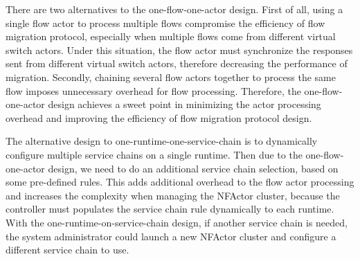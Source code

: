 There are two alternatives to the one-flow-one-actor design. First of all, using a single flow actor to process multiple flows compromise the efficiency of flow migration protocol, especially when multiple flows come from different virtual switch actors. Under this situation, the flow actor must synchronize the responses sent from different virtual switch actors, therefore decreasing the performance of migration. Secondly, chaining several flow actors together to process the same flow imposes unnecessary overhead for flow processing. Therefore, the one-flow-one-actor design achieves a sweet point in minimizing the actor processing overhead and improving the efficiency of flow migration protocol design.

The alternative design to one-runtime-one-service-chain is to dynamically configure multiple service chains on a single runtime. Then due to the one-flow-one-actor design, we need to do an additional service chain selection, based on some pre-defined rules. This adds additional overhead to the flow actor processing and increases the complexity when managing the NFActor cluster, because the controller must populates the service chain rule dynamically to each runtime. With the one-runtime-on-service-chain design, if another service chain is needed, the system administrator could launch a new NFActor cluster and configure a different service chain to use.
